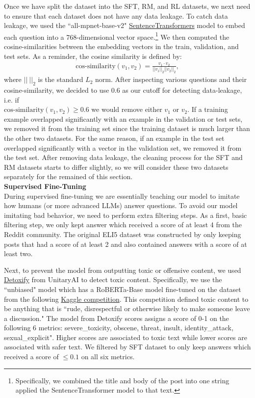 \documentclass[11pt, oneside]{article}   	%
\begin{document}
Once we have split the dataset into the SFT, RM, and RL datasets, we next need to ensure that each dataset does not have any data leakage.
To catch data leakage, we used the ``all-mpnet-base-v2" \href{https://www.sbert.net/}{SentenceTransformers} model to embed each question into a 768-dimensional vector space.\footnote{Specifically, we combined the title and body of the post into one string applied the SentenceTransformer model to that text.}
We then computed the cosine-similarities between the embedding vectors in the train, validation, and test sets. As a reminder, the cosine similarity is defined by:
\begin{align}
\text{cos-similarity}(v_1,v_2)=\frac{v_1\cdot v_2}{|\!|v_1|\!|_2 |\!|v_2|\!|_2},
\end{align}
where $|\!|\ |\!|_2$ is the standard $L_2$ norm.
After inspecting various questions and their cosine-similarity, we decided to use 0.6 as our cutoff for detecting data-leakage, i.e. if \\ $\text{cos-similarity}(v_1,v_2)\geq 0.6$ we would remove either $v_1$ or $v_2$.
If a training example overlapped significantly with an example in the validation or test sets, we removed it from the training set since the training dataset is much larger than the other two datasets.
For the same reason, if an example in the test set overlapped significantly with a vector in the validation set, we removed it from the test set. After removing data leakage, the cleaning process for the SFT and RM datasets starts to differ slightly, so we will consider these two datasets separately for the remained of this section.
\\[10pt]
{\large \textbf{Supervised Fine-Tuning}}
\\[10pt]
During supervised fine-tuning we are essentially teaching our model to imitate how humans (or more advanced LLMs) answer questions.
To avoid our model imitating bad behavior, we need to perform extra filtering steps.
As a first, basic filtering step, we only kept answer which received a score of at least 4 from the Reddit community. 
The original ELI5 dataset was constructed by only keeping posts that had a score of at least 2 and also contained answers with a score of at least two.

Next, to prevent the model from outputting toxic or offensive content, we used \href{https://github.com/unitaryai/detoxify}{Detoxify} from UnitaryAI to detect toxic content.
Specifically, we use the ``unbiased" model which has a RoBERTa-Base model fine-tuned on the dataset from the following \href{https://www.kaggle.com/c/jigsaw-unintended-bias-in-toxicity-classification}{Kaggle competition}. This competition defined toxic content to be anything that is ``rude, disrespectful or otherwise likely to make someone leave a discussion." 
The model from Detoxify scores assigns a score of 0-1 on the following 6 metrics: severe\_toxicity, obscene, threat, insult, identity\_attack, sexual\_explicit".
Higher scores are associated to toxic text while lower scores are associated with safer text.
We filtered by SFT dataset to only keep answers which received a score of $\leq 0.1$ on all six metrics.
\end{document}
